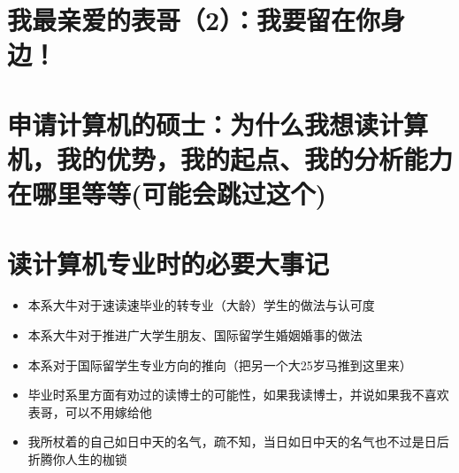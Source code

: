 \documentclass[9pt, b5paper]{article}
\begin{document}
\section{我最亲爱的表哥（2）：我要留在你身边！}
\label{sec:orgc4eb6eb}

\section{申请计算机的硕士：为什么我想读计算机，我的优势，我的起点、我的分析能力在哪里等等(可能会跳过这个)}
\label{sec:org1146ed0}

\section{读计算机专业时的必要大事记}
\label{sec:org88e4632}
\begin{itemize}
\item 本系大牛对于速读速毕业的转专业（大龄）学生的做法与认可度
\item 本系大牛对于推进广大学生朋友、国际留学生婚姻婚事的做法
\item 本系对于国际留学生专业方向的推向（把另一个大25岁马推到这里来）
\item 毕业时系里方面有劝过的读博士的可能性，如果我读博士，并说如果我不喜欢表哥，可以不用嫁给他
\item 我所杖着的自己如日中天的名气，疏不知，当日如日中天的名气也不过是日后折腾你人生的枷锁
\end{itemize}
\end{document}
